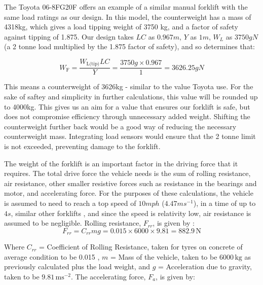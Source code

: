 \documentclass[12pt,titlepage]{article}
\begin{document}
The Toyota 06-8FG20F \cite{Toyota} offers an example of a similar manual forklift with the same load ratings as our design. In this model, the counterweight has a mass of 4318kg, which gives a load tipping weight of 3750 kg, and a factor of safety against tipping of 1.875. Our design takes $LC$ as $0.967m$, $Y$ as $1m$, $W_L$ as $3750gN$ (a 2 tonne load multiplied by the 1.875 factor of safety), and so determines that:

\vspace{-22pt}
\begin{equation}
    W_{\text{F}} = \frac{W_{\text{L(tip)}}LC}{Y} = \frac{3750g \times 0.967}{1} = 3626.25gN
\end{equation}
\vspace{-31pt}

This means a counterweight of 3626kg - similar to the value Toyota use. For the sake of saftey and simplicity in further calculations, this value will be rounded up to 4000kg. This gives us an aim for a value that ensures our forklift is safe, but does not compromise efficiency through unnecessary added weight. Shifting the  counterweight further back would be a good way of reducing the necessary counterweight mass. Integrating load sensors would ensure that the 2 tonne limit is not exceeded, preventing damage to the forklift.

The weight of the forklift is an important factor in the driving force that it requires. The total drive force the vehicle needs is the sum of rolling resistance, air resistance, other smaller resistive forces such as resistance in the bearings and motor, and accelerating force. For the purposes of these calculations, the vehicle is assumed to need to reach a top speed of $10mph$ ($4.47ms^{-1}$), in a time of up to $4s$, similar other forklifts \cite{Forklift_Acceleration_Example}, and since the speed is relativity low, air resistance is assumed to be negligible. Rolling resistance, $F_{rr}$, is given by \cite{Vehicle_Dynamics_And_Control}:
\vspace{-17pt}
\begin{equation}
    F_{rr} = C_{rr} m g = 0.015 \times 6000 \times 9.81 =  882.9 \, \text{N}
\end{equation}
\vspace{-37pt}

Where \( C_{rr} \) = Coefficient of Rolling Resistance, taken for tyres on concrete of average condition to be 0.015  \cite{Rolling_Resistance}, \( m \) = Mass of the vehicle, taken to be \( 6000 \, \text{kg} \) as previously calculated plus the load weight, and \( g \) = Acceleration due to gravity, taken to be \( 9.81 \, \text{ms}^{-2} \). The accelerating force, \( F_a \), is given by:
\end{document}

